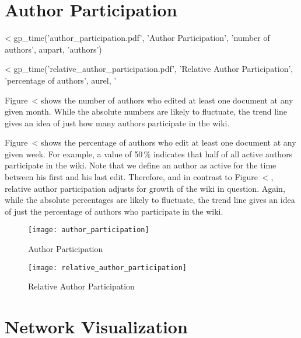 \documentclass{scrartcl}
\begin{document}

\section{Author Participation} %
\label{sec:author_participation}

<%
gp_time('author_participation.pdf', 
        'Author Participation', 'number of authors', 
        aupart, 'authors')

<%
gp_time('relative_author_participation.pdf', 
        'Relative Author Participation', 
        'percentage of authors', 
        aurel, '%

Figure~<%
shows the number of authors who edited at least one document at any given month. While the absolute numbers are likely to fluctuate, the trend line gives an idea of just how many authors participate in the wiki.

Figure~<%
shows the percentage of authors who edit at least one document at any given week. For example, a value of 50\,\% indicates that half of all active authors participate in the wiki. Note that we define an author as active for the time between his first and his last edit. Therefore, and in contrast to Figure~<%
, relative author participation adjusts for growth of the wiki in question. Again, while the absolute percentages are likely to fluctuate, the trend line gives an idea of just the percentage of authors who participate in the wiki.

\begin{figure}[htbp]
  \texttt{[image: author\_participation]}
  \caption{Author Participation}
  \label{fig:author_participation}
  \vfill

  \texttt{[image: relative\_author\_participation]}
  \caption{Relative Author Participation}
  \label{fig:relative_author_participation}
\end{figure}


\section{Network Visualization} %
\label{sec:network_visualization}
\end{document}
